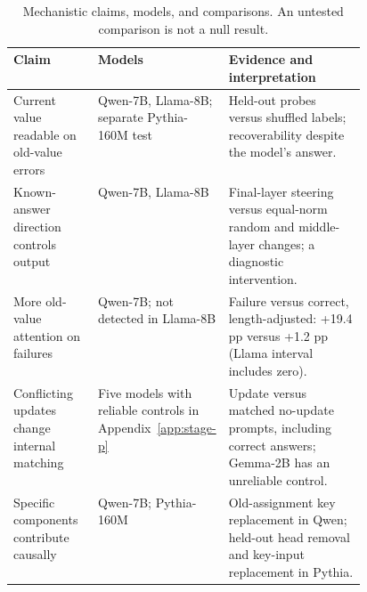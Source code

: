 \begin{table}[htbp]
\centering
\footnotesize
\setlength{\tabcolsep}{4pt}
\caption{Mechanistic claims, models, and comparisons. An untested comparison
is not a null result.}
\label{tab:mechanism-evidence-map}
\begin{tabularx}{\textwidth}{@{}p{0.24\linewidth}p{0.22\linewidth}X@{}}
\toprule
Claim & Models & Evidence and interpretation \\
\midrule
Current value readable on old-value errors & Qwen-7B, Llama-8B; separate Pythia-160M test
& Held-out probes versus shuffled labels; recoverability despite the model's answer. \\
Known-answer direction controls output & Qwen-7B, Llama-8B
& Final-layer steering versus equal-norm random and middle-layer changes; a diagnostic intervention. \\
More old-value attention on failures & Qwen-7B; not detected in Llama-8B
& Failure versus correct, length-adjusted: +19.4 pp versus +1.2 pp (Llama interval includes zero). \\
Conflicting updates change internal matching & Five models with reliable controls in Appendix~\ref{app:stage-p}
& Update versus matched no-update prompts, including correct answers; Gemma-2B has an unreliable control. \\
Specific components contribute causally & Qwen-7B; Pythia-160M
& Old-assignment key replacement in Qwen; held-out head removal and key-input replacement in Pythia. \\
\bottomrule
\end{tabularx}
\end{table}
